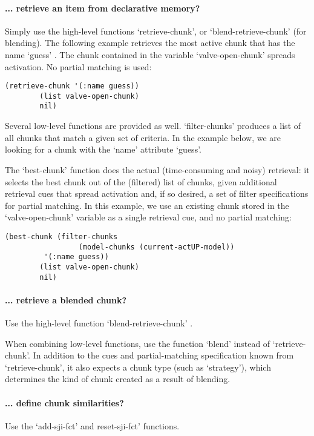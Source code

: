 \documentclass{article}
\begin{document}
\paragraph {... retrieve an item from declarative memory?}

Simply use the high-level functions `retrieve-chunk', or `blend-retrieve-chunk' (for blending).  The following example retrieves the most active chunk that has the name `guess' .  The chunk contained in the variable `valve-open-chunk' 
spreads activation.  No partial matching is used:

\begin{verbatim}
(retrieve-chunk '(:name guess))
	    (list valve-open-chunk) 
	    nil)
\end{verbatim}

Several low-level functions are provided as well.  `filter-chunks' produces a list of all chunks that match a given set of
criteria.  In the example below, we are looking for a chunk with the `name' attribute `guess'.

The `best-chunk' function does the actual (time-consuming and noisy) retrieval: it selects the best chunk out of the (filtered) list of chunks, given additional retrieval cues that spread activation and, if so desired, a set of filter specifications for partial matching.  In this example, we use an existing chunk stored in the `valve-open-chunk' variable as a single retrieval cue, and no partial matching:

\begin{verbatim}
(best-chunk (filter-chunks 
                 (model-chunks (current-actUP-model))
		 '(:name guess))
	    (list valve-open-chunk) 
	    nil)
\end{verbatim}



\paragraph {... retrieve a blended chunk?}

Use the high-level function `blend-retrieve-chunk' .

When combining low-level functions, use the function `blend' instead of `retrieve-chunk'.
In addition to the cues and partial-matching specification known from `retrieve-chunk', it also expects a chunk type (such as `strategy'), which determines the kind of chunk created as a result of blending.


\paragraph {... define chunk similarities?}

Use the `add-sji-fct' and reset-sji-fct' functions.
\end{document}
